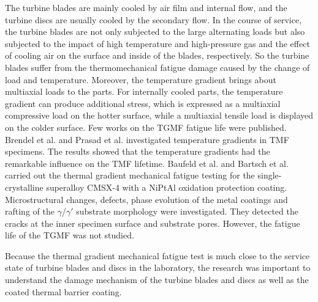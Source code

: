 The turbine blades are mainly cooled by air film and internal flow, and the turbine discs are usually cooled by the secondary flow.
In the course of service, the turbine blades are not only subjected to the large alternating loads but also subjected to the impact of high temperature and high-pressure gas and the effect of cooling air on the surface and inside of the blades, respectively. So the turbine blades suffer from the thermomechanical fatigue damage caused by the change of load and temperature.
Moreover, the temperature gradient brings about multiaxial loads to the parts.
For internally cooled parts, the temperature gradient can produce additional stress, which is expressed as a multiaxial compressive load on the hotter surface, while a multiaxial tensile load is displayed on the colder surface.
Few works on the TGMF fatigue life were published.
Brendel et al. \cite{BRENDEL2008234} and Prasad et al. \cite{PRASAD2013131} investigated temperature gradients in TMF specimens. The results showed that the temperature gradients had the remarkable influence on the TMF lifetime.
Baufeld et al. \cite{BAUFELD2008219} and Bartsch et al. \cite{BARTSCH2008211} carried out the thermal gradient mechanical fatigue testing for the single-crystalline superalloy CMSX-4 with a NiPtAl oxidation protection coating.
Microstructural changes, defects, phase evolution of the metal coatings and rafting of the $\gamma$/$\gamma'$ substrate morphology were investigated. They detected the cracks at the inner specimen surface and substrate pores. However, the fatigue life of the TGMF was not studied.

Because the thermal gradient mechanical fatigue test is much close to the service state of turbine blades and discs in the laboratory, the research was important to understand the damage mechanism of the turbine blades and discs as well as the coated thermal barrier coating.

